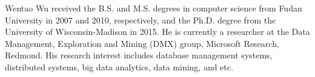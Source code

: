 \documentclass[10pt,journal,cspaper,compsoc]{IEEEtran}
\begin{document}
\begin{minipage}{3.5in}
\vspace*{-5mm}
\begin{IEEEbiography}
  {Wentao Wu} received the B.S. and M.S. degrees in computer science from Fudan
  University in 2007 and 2010, respectively, and the Ph.D. degree from the University
  of Wisconsin-Madison in 2015. He is currently a researcher at the Data Management, Exploration and Mining (DMX) group, Microsoft Research, Redmond.
  His research interest includes database management systems, distributed systems, big data analytics, data mining, and etc.


\end{IEEEbiography}
\end{minipage}
\end{document}
